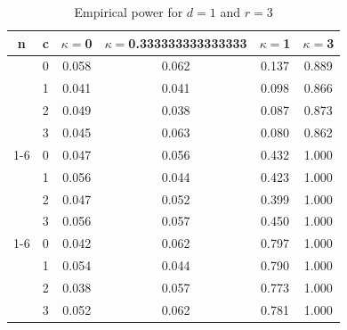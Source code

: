 \documentclass[oneside,11pt]{article}
\begin{document}
\begin{table}[H]
\centering
\caption{Empirical power for $d = 1$ and $r = 3$}
\centering
\begin{tabular}[t]{cccccc}
\toprule
n & c & $\kappa = $0 & $\kappa = $0.333333333333333 & $\kappa = $1 & $\kappa = $3\\
\midrule
 & 0 & 0.058 & 0.062 & 0.137 & 0.889\\

 & 1 & 0.041 & 0.041 & 0.098 & 0.866\\

 & 2 & 0.049 & 0.038 & 0.087 & 0.873\\

\multirow{-4}{*}{\centering\arraybackslash 10} & 3 & 0.045 & 0.063 & 0.080 & 0.862\\
\cmidrule{1-6}
 & 0 & 0.047 & 0.056 & 0.432 & 1.000\\

 & 1 & 0.056 & 0.044 & 0.423 & 1.000\\

 & 2 & 0.047 & 0.052 & 0.399 & 1.000\\

\multirow{-4}{*}{\centering\arraybackslash 50} & 3 & 0.056 & 0.057 & 0.450 & 1.000\\
\cmidrule{1-6}
 & 0 & 0.042 & 0.062 & 0.797 & 1.000\\

 & 1 & 0.054 & 0.044 & 0.790 & 1.000\\

 & 2 & 0.038 & 0.057 & 0.773 & 1.000\\

\multirow{-4}{*}{\centering\arraybackslash 100} & 3 & 0.052 & 0.062 & 0.781 & 1.000\\
\bottomrule
\end{tabular}
\end{table}
\end{document}
